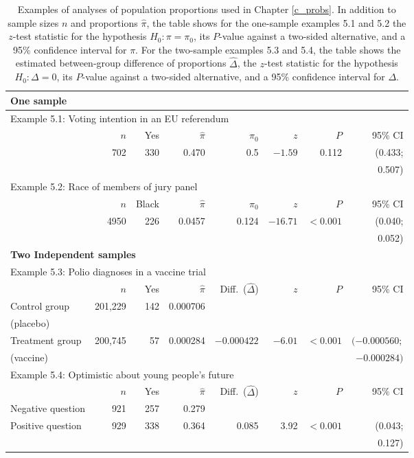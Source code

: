 \begin{table}[t]
\caption{Examples of analyses of population proportions used in Chapter
\ref{c_probs}. In addition to sample sizes $n$ and proportions
$\hat{\pi}$, the table shows for
the one-sample examples 5.1 and 5.2 the
$z$-test statistic for the
hypothesis $H_{0}: \pi=\pi_{0}$, its $P$-value against
a two-sided alternative, and a 95\% confidence interval for $\pi$.
For the two-sample examples 5.3 and 5.4, the table shows
the estimated between-group difference of proportions $\hat{\Delta}$,
the $z$-test statistic for the
hypothesis $H_{0}: \Delta=0$, its $P$-value against
a two-sided alternative, and a 95\% confidence interval for $\Delta$.
}
\label{t_probex}
\begin{small}
\begin{center}
\begin{tabular}{|lrrrrrrr|}\hline
\multicolumn{8}{|l|}{\textbf{One sample}} \\ \hline
\multicolumn{8}{|l|}{Example 5.1:
Voting intention in an EU referendum} \\
& $n$ & Yes & $\hat{\pi}$ & $\pi_{0}$ & $z$ & $P$ & 95\% CI \\ \hline
 &
702 & 330 & 0.470 & 0.5 & $-1.59$ & 0.112 & (0.433;\\
& & & & & & & 0.507) \\ \hline
\multicolumn{8}{|l|}{Example 5.2: Race of members of jury panel} \\
& $n$ & Black & $\hat{\pi}$ & $\pi_{0}$ & $z$ & $P$ & 95\% CI \\ \hline
 &
4950 & 226 & 0.0457 & 0.124& $-16.71$ & $<0.001$ & (0.040;\\
& & & & & & & 0.052) \\
\hline \hline
\multicolumn{8}{|l|}{\textbf{Two Independent samples}} \\ \hline
\multicolumn{8}{|l|}{Example 5.3: Polio diagnoses in a vaccine trial}\\
& $n$ & Yes & $\hat{\pi}$ & Diff.\ ($\hat{\Delta}$)& $z$ & $P$ & 95\% CI \\ \hline
Control group
& 201,229 & 142 & 0.000706 & & & &   \\
(placebo) & & & & & & & \\
Treatment group
& 200,745 & 57& 0.000284 & $-0.000422$
& $-6.01$& $<0.001$&  $(-0.000560;$ \\
(vaccine)
& & & & & & & $-0.000284)$ \\ \hline
\multicolumn{8}{|l|}{Example 5.4: Optimistic about young people's future}\\
& $n$ & Yes & $\hat{\pi}$ & Diff.\ ($\hat{\Delta}$)& $z$ & $P$ & 95\% CI \\ \hline
Negative question
& 921 & 257& 0.279 & & & &   \\
Positive question
& 929 & 338& 0.364 & 0.085 & 3.92& $<0.001$& (0.043;\\
& & & & & & & 0.127) \\
\hline
\end{tabular}
\end{center}
\end{small}
\end{table}

